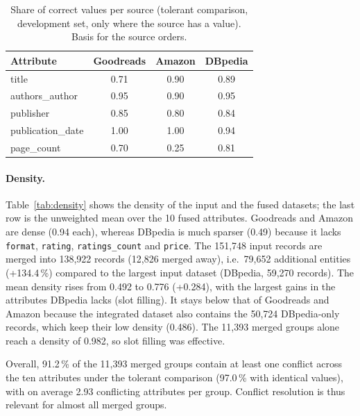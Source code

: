 \documentclass[a4paper,11pt]{article}
\begin{document}
\begin{table}[t]
\centering
\caption{Share of correct values per source (tolerant comparison, development
set, only where the source has a value). Basis for the source orders.}
\label{tab:reliability}
\begin{tabular}{lccc}
\toprule
Attribute & Goodreads & Amazon & DBpedia \\
\midrule
title            & 0.71 & 0.90 & 0.89 \\
authors\_author  & 0.95 & 0.90 & 0.95 \\
publisher        & 0.85 & 0.80 & 0.84 \\
publication\_date& 1.00 & 1.00 & 0.94 \\
page\_count      & 0.70 & 0.25 & 0.81 \\
\bottomrule
\end{tabular}
\end{table}


\paragraph{Density.}
Table~\ref{tab:density} shows the density of the input and the fused datasets; the
last row is the unweighted mean over the 10 fused attributes. Goodreads and Amazon
are dense (0.94 each), whereas DBpedia is much sparser (0.49) because it lacks
\texttt{format}, \texttt{rating}, \texttt{ratings\_count} and \texttt{price}.
The 151,748 input records are merged into 138,922 records (12,826 merged away),
i.e.\ 79,652 additional entities (+134.4\,\%) compared to the largest input dataset
(DBpedia, 59,270 records). The mean density rises from 0.492 to 0.776
(+0.284), with the largest gains in the attributes DBpedia lacks (slot filling).
It stays below that of Goodreads and Amazon because the integrated dataset also
contains the 50,724 DBpedia-only records, which keep their low density (0.486).
The 11,393 merged groups alone reach a density of 0.982, so slot filling was
effective.


Overall, 91.2\,\% of the 11,393 merged groups contain at least one conflict across
the ten attributes under the tolerant comparison (97.0\,\% with identical values),
with on average 2.93 conflicting attributes per group. Conflict resolution is thus
relevant for almost all merged groups.
\end{document}
